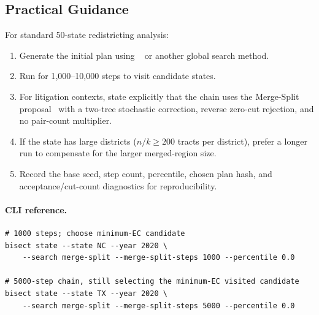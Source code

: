 \subsection{Practical Guidance}

For standard 50-state redistricting analysis:

\begin{enumerate}
  \item Generate the initial plan using \cs{}~\citep{b11paper} or
        another global search method.
  \item Run \mergesplit{} for 1{,}000--10{,}000 steps to visit candidate
        states.
  \item For litigation contexts, state explicitly that the chain uses the
        Merge-Split proposal~\citep{janson2022} with a two-tree stochastic
        correction, reverse zero-cut rejection, and no pair-count multiplier.
  \item If the state has large districts ($n/k \geq 200$ tracts per
        district), prefer a longer run to compensate for the larger
        merged-region size.
  \item Record the base seed, step count, percentile, chosen plan hash, and
        acceptance/cut-count diagnostics for reproducibility.
\end{enumerate}

\paragraph{CLI reference.}
\begin{verbatim}
# 1000 steps; choose minimum-EC candidate
bisect state --state NC --year 2020 \
    --search merge-split --merge-split-steps 1000 --percentile 0.0

# 5000-step chain, still selecting the minimum-EC visited candidate
bisect state --state TX --year 2020 \
    --search merge-split --merge-split-steps 5000 --percentile 0.0
\end{verbatim}
